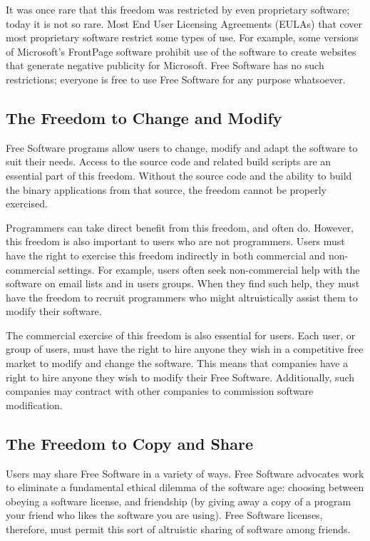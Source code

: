 \documentclass[12pt]{report}
\begin{document}
It was once rare that this freedom was restricted by even proprietary
software; today it is not so rare.  Most End User Licensing Agreements
(EULAs) that cover most proprietary software restrict some types of use.
For example, some versions of Microsoft's FrontPage software prohibit use
of the software to create websites that generate negative publicity for
Microsoft.  Free Software has no such restrictions; everyone is free to
use Free Software for any purpose whatsoever.

\subsection{The Freedom to Change and Modify}

Free Software programs allow users to change, modify and adapt the
software to suit their needs.  Access to the source code and related build
scripts are an essential part of this freedom.  Without the source code
and the ability to build the binary applications from that source, the
freedom cannot be properly exercised.

Programmers can take direct benefit from this freedom, and often do.
However, this freedom is also important to users who are not programmers.
Users must have the right to exercise this freedom indirectly in both
commercial and non-commercial settings.  For example, users often seek
non-commercial help with the software on email lists and in users groups.
When they find such help, they must have the freedom to recruit
programmers who might altruistically assist them to modify their software.

The commercial exercise of this freedom is also essential for users.  Each
user, or group of users, must have the right to hire anyone they wish in a
competitive free market to modify and change the software.  This means
that companies have a right to hire anyone they wish to modify their Free
Software.  Additionally, such companies may contract with other companies
to commission software modification.

\subsection{The Freedom to Copy and Share}

Users may share Free Software in a variety of ways.  Free Software
advocates work to eliminate a fundamental ethical dilemma of the software
age: choosing between obeying a software license, and friendship (by
giving away a copy of a program your friend who likes the software you are
using).  Free Software licenses, therefore, must permit this sort of
altruistic sharing of software among friends.
\end{document}
